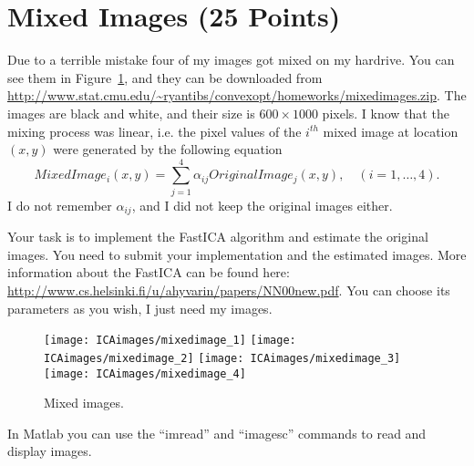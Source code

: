 \section{Mixed Images (25 Points)}

Due to a terrible mistake four of my images got mixed on my hardrive. You can see them in Figure~\ref{fig:MixedImages}, and they can be downloaded from \url{http://www.stat.cmu.edu/~ryantibs/convexopt/homeworks/mixedimages.zip}.
The images are black and white, and their size is $600\times 1000$ pixels.
I know that the mixing process was linear, i.e. the pixel values of the $i^{th}$ mixed image at location $(x,y)$
were generated by the following equation
$$MixedImage_i(x,y)= \sum_{j=1}^4 \alpha_{ij} OriginalImage_j(x,y), \quad (i=1,\ldots,4).$$ I do not remember $\alpha_{ij}$, and I did not keep the original images either.


Your task is to implement the FastICA algorithm  and estimate the original images. You need to submit your implementation and the estimated images. More information about the FastICA can be found here:
\url{http://www.cs.helsinki.fi/u/ahyvarin/papers/NN00new.pdf}. 
You can choose its parameters as you wish, I just need my images.

\begin{figure}
  \centering
  \texttt{[image: ICAimages/mixedimage\_1]}
  \texttt{[image: ICAimages/mixedimage\_2]}
  \texttt{[image: ICAimages/mixedimage\_3]}
  \texttt{[image: ICAimages/mixedimage\_4]}
  \caption{Mixed images.}
  \label{fig:MixedImages}
\end{figure}

In Matlab you can use the ``imread'' and ``imagesc'' commands to read and display images.


